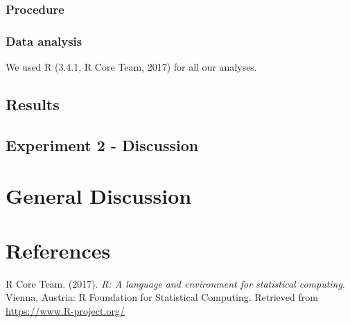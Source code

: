 \documentclass[english,man]{apa6}
\theoremstyle{definition}
\theoremstyle{definition}
\theoremstyle{remark}
\begin{document}
\subsubsection{Procedure}\label{procedure-1}

\subsubsection{Data analysis}\label{data-analysis-1}

We used R (3.4.1, R Core Team, 2017) for all our analyses.

\subsection{Results}\label{results}

\subsection{Experiment 2 - Discussion}\label{experiment-2---discussion}

\section{General Discussion}\label{general-discussion}

\newpage

\section{References}\label{references}

\setlength{\parindent}{-0.5in} \setlength{\leftskip}{0.5in}

\hypertarget{refs}{}
\hypertarget{ref-R-base}{}
R Core Team. (2017). \emph{R: A language and environment for statistical
computing}. Vienna, Austria: R Foundation for Statistical Computing.
Retrieved from \url{https://www.R-project.org/}
\end{document}
